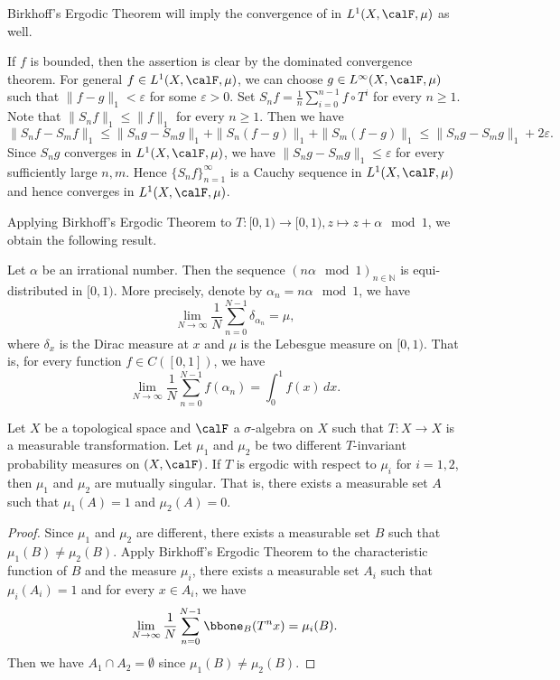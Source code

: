   \begin{remark}
    Birkhoff's Ergodic Theorem will imply the convergence of in $L^1(X, \calF, \mu)$ as well. 

    If $f$ is bounded, then the assertion is clear by the dominated convergence theorem.
    For general $f \in L^1(X, \calF, \mu)$, we can choose $g \in L^\infty(X, \calF, \mu)$ such that $\|f-g\|_1 < \varepsilon$ for some $\varepsilon > 0$.
    Set $S_n f = \frac{1}{n} \sum_{i=0}^{n-1} f \circ T^i$ for every $n \geq 1$.
    Note that $\|S_n f\|_1 \leq \|f\|_1$ for every $n \geq 1$.
    Then we have 
    \[ \|S_n f - S_m f\|_1 \leq \|S_n g - S_m g\|_1 + \|S_n (f-g)\|_1 + \|S_m (f-g)\|_1 \leq \|S_n g - S_m g\|_1 + 2\varepsilon. \]
    Since $S_n g$ converges in $L^1(X, \calF, \mu)$, we have $\|S_n g - S_m g\|_1 \leq \varepsilon$ for every sufficiently large $n, m$.
    Hence $\{S_n f\}_{n=1}^\infty$ is a Cauchy sequence in $L^1(X, \calF, \mu)$ and hence converges in $L^1(X, \calF, \mu)$.
  \end{remark}


  Applying Birkhoff's Ergodic Theorem to $T: [0,1) \to [0,1), z \mapsto z + \alpha \mod 1$, we obtain the following result.

  \begin{corollary}
    Let $\alpha$ be an irrational number. 
    Then the sequence $(n \alpha \mod 1)_{n \in \mathbb{N}}$ is equi-distributed in $[0,1)$.
    More precisely, denote by $\alpha_n = n \alpha \mod 1$, we have 
    \[ \lim_{N \to \infty} \frac{1}{N} \sum_{n=0}^{N-1} \delta_{\alpha_n} = \mu, \]
    where $\delta_x$ is the Dirac measure at $x$ and $\mu$ is the Lebesgue measure on $[0,1)$.
    That is, for every function $f \in C([0,1])$, we have
    \[ \lim_{N \to \infty} \frac{1}{N} \sum_{n=0}^{N-1} f(\alpha_n) = \int_0^1 f(x) \, dx. \]
  \end{corollary}


  \begin{corollary}
    Let $X$ be a topological space and $\calF$ a $\sigma$-algebra on $X$ such that $T: X \to X$ is a measurable transformation.
    Let $\mu_1$ and $\mu_2$ be two different $T$-invariant probability measures on $(X, \calF)$.
    If $T$ is ergodic with respect to $\mu_i$ for $i=1,2$, then $\mu_1$ and $\mu_2$ are mutually singular.
    That is, there exists a measurable set $A$ such that $\mu_1(A) = 1$ and $\mu_2(A) = 0$.
  \end{corollary}
  \begin{proof}
    Since $\mu_1$ and $\mu_2$ are different, there exists a measurable set $B$ such that $\mu_1(B) \neq \mu_2(B)$.
    Apply Birkhoff's Ergodic Theorem to the characteristic function of $B$ and the measure $\mu_i$, there exists a measurable set $A_i$ such that $\mu_i(A_i) = 1$ and for every $x \in A_i$, we have
    \[ \lim_{N \to \infty} \frac{1}{N} \sum_{n=0}^{N-1} \bbone_B(T^n x) = \mu_i(B). \]
    Then we have $A_1 \cap A_2 = \emptyset$ since $\mu_1(B) \neq \mu_2(B)$.
  \end{proof}

